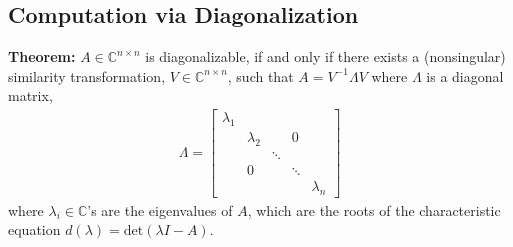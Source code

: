 \documentclass[twoside]{article}
\begin{document}
\subsection{Computation via Diagonalization}

\textbf{Theorem:} $A \in \mathbb{C}^{n \times n}$ is diagonalizable, if and only if there exists a (nonsingular) similarity transformation, 
$V \in \mathbb{C}^{n \times n}$, such that $A = V^{-1} \Lambda V$ where $\Lambda$ is a diagonal matrix, 
%
\begin{align*}
	\Lambda = \left[ \begin{array}{ccccc} \lambda_1 &  & & &  \\  & \lambda_2  &  & 0 &  \\ &  & \ddots & \\ & 0 & & \ddots & \\ & &  & &  \lambda_n \end{array} \right]
\end{align*}
%
where $\lambda_i \in \mathbb{C}$'s are the eigenvalues of $A$, which are the roots of the characteristic equation $d(\lambda) = \mathrm{det}(\lambda I - A)$.
\end{document}

